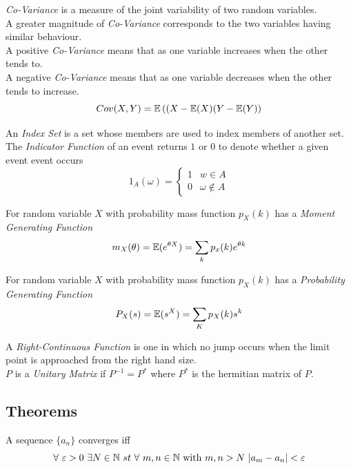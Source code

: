\documentclass[11pt,a4paper]{article}
\begin{document}
\textit{Co-Variance} is a measure of the joint variability of two random variables.\\
A greater magnitude of \textit{Co-Variance} corresponds to the two variables having similar behaviour.\\
A positive \textit{Co-Variance} means that as one variable increases when the other tends to.\\
A negative \textit{Co-Variance} means that as one variable decreases when the other tends to increase.\\
$$Cov(X,Y)=\mathbb{E}\left((X-\mathbb{E}(X)(Y-\mathbb{E}(Y)\right)$$

An \textit{Index Set} is a set whose members are used to index members of another set.\\

The \textit{Indicator Function} of an event returns $1$ or $0$ to denote whether a given event event occurs
$$1_A(\omega)=\begin{cases}1&w\in A\\0&\omega\not\in A\end{cases}$$

For random variable $X$ with probability mass function $p_X(k)$ has a \textit{Moment Generating Function}
$$m_X(\theta)=\mathbb{E}(e^{\theta X})=\sum_k p_x(k)e^{\theta k}$$

For random variable $X$ with probability mass function $p_X(k)$ has a \textit{Probability Generating Function}
$$P_X(s)=\mathbb{E}(s^X)=\sum_Kp_X(k)s^k$$

A \textit{Right-Continuous Function} is one in which no jump occurs when the limit point is approached from the right hand size.\\

$P$ is a \textit{Unitary Matrix} if $P^{-1}=P^*$ where $P^*$ is the hermitian matrix of $P$.

\subsection{Theorems}

A sequence $\{a_n\}$ converges iff
$$\forall\ \varepsilon>0\ \exists N\in\nats\ st\ \forall\ m,n\in\nats\ \mathrm{with}\ m,n>N\ |a_m-a_n|<\varepsilon$$
\end{document}
